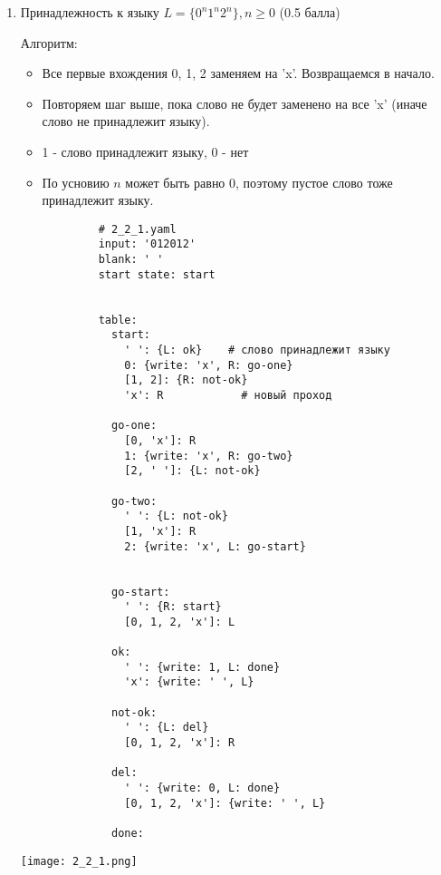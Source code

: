 \documentclass{article}
\begin{document}
\begin{enumerate}

    \item Принадлежность к языку $L = \{ 0^n1^n2^n \}, n \ge 0$ (0.5 балла)
    
        Алгоритм:
        \begin{itemize}
            \item Все первые вхождения 0, 1, 2 заменяем на 'x'. Возвращаемся в начало.
            \item Повторяем шаг выше, пока слово не будет заменено на все 'x' (иначе слово не принадлежит языку).
            \item 1 - слово принадлежит языку, 0 - нет
            \item По усновию $n$ может быть равно 0, поэтому пустое слово тоже принадлежит языку. 
        \end{itemize}
        
        \begin{verbatim}
            # 2_2_1.yaml
            input: '012012'
            blank: ' '
            start state: start
            
            
            table:
              start:
                ' ': {L: ok}    # слово принадлежит языку
                0: {write: 'x', R: go-one} 
                [1, 2]: {R: not-ok}
                'x': R            # новый проход
              
              go-one:
                [0, 'x']: R    
                1: {write: 'x', R: go-two} 
                [2, ' ']: {L: not-ok}
              
              go-two:
                ' ': {L: not-ok}
                [1, 'x']: R
                2: {write: 'x', L: go-start}
            
              
              go-start:
                ' ': {R: start}
                [0, 1, 2, 'x']: L 
                
              ok:
                ' ': {write: 1, L: done}
                'x': {write: ' ', L}
              
              not-ok:
                ' ': {L: del}
                [0, 1, 2, 'x']: R
              
              del:
                ' ': {write: 0, L: done}
                [0, 1, 2, 'x']: {write: ' ', L} 
            
              done:
        \end{verbatim}
        \begin{center}
            \texttt{[image: 2\_2\_1.png]} \\
        \end{center}
        

\end{enumerate}
\end{document}

